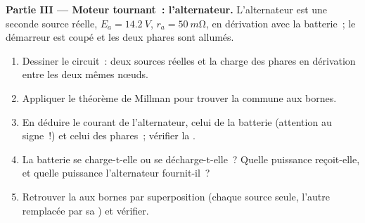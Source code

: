 \begin{problem}
\medskip
\noindent\textbf{Partie III --- Moteur tournant~: l'alternateur.}
L'alternateur est une seconde source réelle, $E_a = \qty{14.2}{V}$,
$r_a = \qty{50}{m\ohm}$, en dérivation avec la batterie~; le démarreur
est coupé et les deux phares sont allumés.
\begin{enumerate}[resume]
  \item Dessiner le circuit~: deux sources réelles et la charge des
        phares en dérivation entre les deux mêmes nœuds.
  \item Appliquer le théorème de Millman pour trouver la  commune
        aux bornes.
  \item En déduire le courant de l'alternateur, celui de la batterie
        (attention au signe~!) et celui des phares~; vérifier la .
  \item La batterie se charge-t-elle ou se décharge-t-elle~? Quelle
        puissance reçoit-elle, et quelle puissance l'alternateur
        fournit-il~?
  \item Retrouver la  aux bornes par superposition (chaque source
        seule, l'autre remplacée par sa ) et vérifier.
\end{enumerate}


\end{problem}
